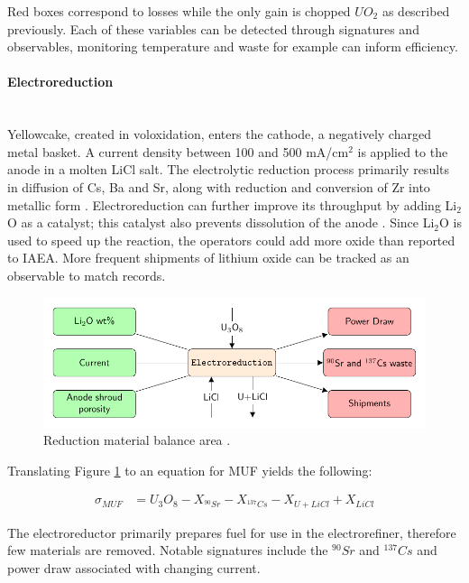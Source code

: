 Red boxes correspond to losses while the only gain is chopped $UO_2$ as described previously. Each of these variables can be detected through signatures and observables, monitoring temperature and waste for example can inform efficiency.

\paragraph{Electroreduction} \mbox{}\\ 
Yellowcake, created in voloxidation, enters the cathode, a negatively charged metal basket. 
A current density between 100 and 500 mA/cm$^2$ is applied to the anode in a molten LiCl salt. 
The electrolytic reduction process primarily results in diffusion of Cs, Ba and Sr, along with reduction and conversion of Zr into metallic form \cite{choi_electrochemical_2015,flowsheet_1998}.
Electroreduction can further improve its throughput by adding Li$_2$O as a catalyst; this catalyst also prevents dissolution 
of the anode \cite{choi_electrochemical_2015}. Since Li$_2$O is used to speed up the reaction,
the operators could add more oxide than reported to \gls{IAEA}. More frequent shipments 
of lithium oxide can be tracked as an observable to match records.

\begin{figure}[h]
	\centering
	\includegraphics[width=0.9\linewidth]{images/reduction}
	\caption{Reduction material balance area \cite{lee_advanced_2008}.}
	\label{fig:reduction}
\end{figure}

Translating Figure \ref{fig:reduction} to an equation for MUF yields the following:

\begin{align}
\sigma_{MUF} &= U_3O_8 - X_{^{90}Sr} - X_{^{137}Cs} - X_{U+LiCl} + X_{LiCl}
\end{align}

The electroreductor primarily prepares fuel for use in the electrorefiner, therefore few materials are removed. Notable signatures include the $^{90}Sr$ and $^{137}Cs$ and power draw associated with changing current.


